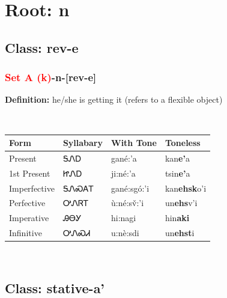 \needspace{4in}
\section*{Root: n}
\nopagebreak
{}
\needspace{3in}
\subsection*{Class: rev-e}
\nopagebreak
\needspace{2in}
\subsubsection*{\textcolor{Red}{Set A (k)}{-}\textbf{n}{-}[rev-e]}
\nopagebreak
\textbf{Definition: } he/she is getting it (refers to a flexible object)
\\[0.5em]
\begin{tabularx}{\textwidth}{l X X X}%
\toprule%
\textbf{Form}&\textbf{Syllabary}&\textbf{With Tone}&\textbf{Toneless}\\%
\midrule%
Present&ᎦᏁᎠ&gané:’a&kan\textbf{e'}a\\%
1st Present&ᏥᏁᎠ&ji:né:’a&tsin\textbf{e'}a\\%
Imperfective&ᎦᏁᏍᎪᎢ&gané:sgó:’i&kan\textbf{ehsk}o'i\\%
Perfective&ᎤᏁᏒᎢ&ù:né:sv̌:’i&un\textbf{ehs}v'i\\%
Imperative&ᎯᎾᎩ&hi:nagi&hin\textbf{aki}\\%
Infinitive&ᎤᏁᏍᏗ&u:nè:sdi&un\textbf{ehst}i\\%
\bottomrule%
\end{tabularx}
\\[1em]
\needspace{3in}
\subsection*{Class: stative-a'}
\nopagebreak
\needspace{2in}
